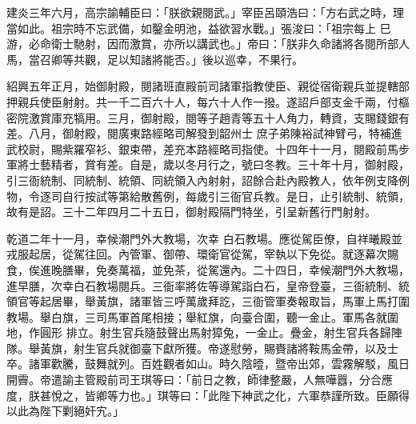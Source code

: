 \begin{pinyinscope}
 建炎三年六月，高宗諭輔臣曰：「朕欲親閱武。」宰臣呂頤浩曰：「方右武之時，理當如此。祖宗時不忘武備，如鑿金明池，益欲習水戰。」張浚曰：「祖宗每上
 巳游，必命衛士馳射，因而激賞，亦所以講武也。」帝曰：「朕非久命諸將各閱所部人馬，當召卿等共觀，足以知諸將能否。」後以巡幸，不果行。



 紹興五年正月，始御射殿，閱諸班直殿前司諸軍指教使臣、親從宿衛親兵並提轄部押親兵使臣射射。共一千二百六十人，每六十人作一撥。遂詔戶部支金千兩，付樞密院激賞庫充犒用。三月，御射殿，閱等子趙青等五十人角力，轉資，支賜錢銀有差。八月，御射殿，閱廣東路經略司解發到韶州士
 庶子弟陳裕試神臂弓，特補進武校尉，賜紫羅窄衫、銀束帶，差充本路經略司指使。十四年十一月，閱殿前馬步軍將士藝精者，賞有差。自是，歲以冬月行之，號曰冬教。三十年十月，御射殿，引三衙統制、同統制、統領、同統領入內射射，詔餘合赴內殿教人，依年例支降例物，令逐司自行按試等第給散舊例，每歲引三衙官兵教。是日，止引統制、統領，故有是詔。三十二年四月二十五日，御射殿隔門特坐，引呈新舊行門射射。



 乾道二年十一月，幸候潮門外大教場，次幸
 白石教場。應從駕臣僚，自祥曦殿並戎服起居，從駕往回。內管軍、御帶、環衛官從駕，宰執以下免從。就逐幕次賜食，俟進晚膳畢，免奏萬福，並免茶，從駕還內。二十四日，幸候潮門外大教場，進早膳，次幸白石教場閱兵。三衙率將佐等導駕詣白石，皇帝登臺，三衙統制、統領官等起居畢，舉黃旗，諸軍皆三呼萬歲拜訖，三衙管軍奏報取旨，馬軍上馬打圍教場。舉白旗，三司馬軍首尾相接；舉紅旗，向臺合圍，聽一金止。軍馬各就圍地，作圓形
 排立。射生官兵隨鼓聲出馬射獐兔，一金止。疊金，射生官兵各歸陣隊。舉黃旗，射生官兵就御臺下獻所獲。帝遂慰勞，賜賚諸將鞍馬金帶，以及士卒。諸軍歡騰，鼓舞就列。百姓觀者如山。時久陰曀，暨帝出郊，雲霧解駁，風日開霽。帝遣諭主管殿前司王琪等曰：「前日之教，師律整嚴，人無嘩囂，分合應度，朕甚悅之，皆卿等力也。」琪等曰：「此陛下神武之化，六軍恭謹所致。臣願得以此為陛下剿絕奸宄。」




\end{pinyinscope}
